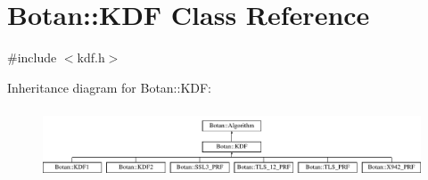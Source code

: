 \hypertarget{classBotan_1_1KDF}{\section{Botan\-:\-:K\-D\-F Class Reference}
\label{classBotan_1_1KDF}
}


{\ttfamily \#include $<$kdf.\-h$>$}

Inheritance diagram for Botan\-:\-:K\-D\-F\-:\begin{figure}[H]
\begin{center}
\leavevmode
\includegraphics[height=2.121212cm]{classBotan_1_1KDF}
\end{center}
\end{figure}
